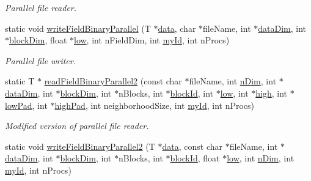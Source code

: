 \begin{DoxyCompactItemize}
\begin{DoxyCompactList}\small\item\em Parallel file reader. \item\end{DoxyCompactList}\item 
static void \hyperlink{classITL__ioutil_afec3a839fe31a416641c5e0ad2dc4669}{writeFieldBinaryParallel} (T $\ast$\hyperlink{MainIT__regvector_8cpp_a783b2b1c03f80ec0d3ed965238d6bd65}{data}, char $\ast$fileName, int $\ast$\hyperlink{MainIT__regvector_8cpp_a1b6b235a26917090521e783da84ef326}{dataDim}, int $\ast$\hyperlink{MainIT__regvector_8cpp_a3d5a7fab820f74511d7978e3611ae905}{blockDim}, float $\ast$\hyperlink{MainIT__regvector_8cpp_abb1e2dad97264e859f3ee8af1341d68c}{low}, int nFieldDim, int \hyperlink{MainIT__regvector_8cpp_a556290f6728d2e8721669d530981a077}{myId}, int nProcs)
\begin{DoxyCompactList}\small\item\em Parallel file writer. \item\end{DoxyCompactList}\item 
static T $\ast$ \hyperlink{classITL__ioutil_a30703d23067b4ded11a11533d204d185}{readFieldBinaryParallel2} (const char $\ast$fileName, int \hyperlink{MainIT__regvector_8cpp_a49f80c85e94dab34e43eefa8569b847a}{nDim}, int $\ast$\hyperlink{MainIT__regvector_8cpp_a1b6b235a26917090521e783da84ef326}{dataDim}, int $\ast$\hyperlink{MainIT__regvector_8cpp_a3d5a7fab820f74511d7978e3611ae905}{blockDim}, int $\ast$nBlocks, int $\ast$\hyperlink{MainIT__regvector_8cpp_a3b0be19f729a7cb8162d1f92e1f650fb}{blockId}, int $\ast$\hyperlink{MainIT__regvector_8cpp_abb1e2dad97264e859f3ee8af1341d68c}{low}, int $\ast$\hyperlink{MainIT__regvector_8cpp_a2012a18ba7a98e566c072356d03c4240}{high}, int $\ast$\hyperlink{MainIT__regvector_8cpp_a4f25631e4cedb3a6318d8a9166ab454d}{lowPad}, int $\ast$\hyperlink{MainIT__regvector_8cpp_a41c49039cbd24b06ac2adf735b8e8bdf}{highPad}, int neighborhoodSize, int \hyperlink{MainIT__regvector_8cpp_a556290f6728d2e8721669d530981a077}{myId}, int nProcs)
\begin{DoxyCompactList}\small\item\em Modified version of parallel file reader. \item\end{DoxyCompactList}\item 
static void \hyperlink{classITL__ioutil_acb4e02d17a9e6df557788862498a3f6a}{writeFieldBinaryParallel2} (T $\ast$\hyperlink{MainIT__regvector_8cpp_a783b2b1c03f80ec0d3ed965238d6bd65}{data}, const char $\ast$fileName, int $\ast$\hyperlink{MainIT__regvector_8cpp_a1b6b235a26917090521e783da84ef326}{dataDim}, int $\ast$\hyperlink{MainIT__regvector_8cpp_a3d5a7fab820f74511d7978e3611ae905}{blockDim}, int $\ast$nBlocks, int $\ast$\hyperlink{MainIT__regvector_8cpp_a3b0be19f729a7cb8162d1f92e1f650fb}{blockId}, float $\ast$\hyperlink{MainIT__regvector_8cpp_abb1e2dad97264e859f3ee8af1341d68c}{low}, int \hyperlink{MainIT__regvector_8cpp_a49f80c85e94dab34e43eefa8569b847a}{nDim}, int \hyperlink{MainIT__regvector_8cpp_a556290f6728d2e8721669d530981a077}{myId}, int nProcs)

\end{DoxyCompactItemize}
